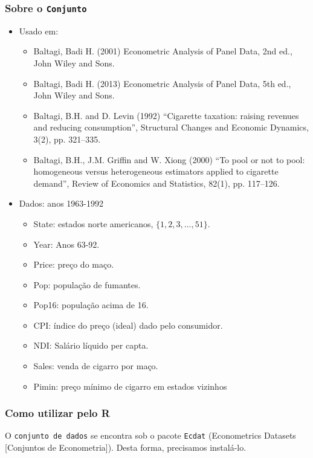 \documentclass[11pt]{article}
\begin{document}
\subsubsection{Sobre o \texttt{Conjunto}}
\label{sec:org40b89a5}
\begin{itemize}
\item Usado em:
\begin{itemize}
\item Baltagi, Badi H. (2001) Econometric Analysis of Panel Data, 2nd ed., John Wiley and Sons.
\item Baltagi, Badi H. (2013) Econometric Analysis of Panel Data, 5th ed., John Wiley and Sons.
\item Baltagi, B.H. and D. Levin (1992) “Cigarette taxation: raising revenues and reducing consumption”, Structural Changes and Economic Dynamics, 3(2), pp. 321–335.
\item Baltagi, B.H., J.M. Griffin and W. Xiong (2000) “To pool or not to pool: homogeneous versus heterogeneous estimators applied to cigarette demand”, Review of Economics and Statistics, 82(1), pp. 117–126.
\end{itemize}
\item Dados: anos 1963-1992
\begin{itemize}
\item State: estados norte americanos, \(\{1,2,3, \ldots, 51\}\).
\item Year: Anos 63-92.
\item Price: preço do maço.
\item Pop: população de fumantes.
\item Pop16: população acima de 16.
\item CPI: índice do preço (ideal) dado pelo consumidor.
\item NDI: Salário líquido per capta.
\item Sales: venda de cigarro por maço.
\item Pimin: preço mínimo de cigarro em estados vizinhos
\end{itemize}
\end{itemize}
\subsubsection{Como utilizar pelo R}
\label{sec:org823f260}

O \texttt{conjunto de dados} se encontra sob o pacote \texttt{Ecdat} (Econometrics
Datasets [Conjuntos de Econometria]). Desta forma, precisamos
instalá-lo.
\end{document}
